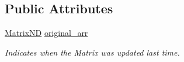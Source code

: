 \subsection*{Public Attributes}
\begin{DoxyCompactItemize}
\item 
\hypertarget{class_updatable_matrix_ae79f618a746822c858e40af708c786af}{}\hyperlink{class_matrix_n_d}{Matrix\+N\+D} \hyperlink{class_updatable_matrix_ae79f618a746822c858e40af708c786af}{original\+\_\+arr}\label{class_updatable_matrix_ae79f618a746822c858e40af708c786af}

\begin{DoxyCompactList}\small\item\em Indicates when the Matrix was updated last time. \end{DoxyCompactList}\end{DoxyCompactItemize}

